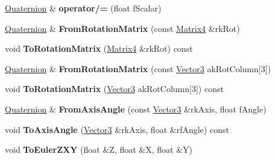 \begin{DoxyCompactItemize}
\item 
\hyperlink{class_magnum_1_1_quaternion}{Quaternion} \& {\bfseries operator/=} (float f\+Scalar)\hypertarget{class_magnum_1_1_quaternion_aa4cd592c599799502807638c4d74e679}{}\label{class_magnum_1_1_quaternion_aa4cd592c599799502807638c4d74e679}

\item 
\hyperlink{class_magnum_1_1_quaternion}{Quaternion} \& {\bfseries From\+Rotation\+Matrix} (const \hyperlink{class_magnum_1_1_matrix4}{Matrix4} \&rk\+Rot)\hypertarget{class_magnum_1_1_quaternion_a3c4faad300d6c95723f59189d76ca893}{}\label{class_magnum_1_1_quaternion_a3c4faad300d6c95723f59189d76ca893}

\item 
void {\bfseries To\+Rotation\+Matrix} (\hyperlink{class_magnum_1_1_matrix4}{Matrix4} \&rk\+Rot) const \hypertarget{class_magnum_1_1_quaternion_a5547a9e5d62aad19551a23bb74a261d1}{}\label{class_magnum_1_1_quaternion_a5547a9e5d62aad19551a23bb74a261d1}

\item 
\hyperlink{class_magnum_1_1_quaternion}{Quaternion} \& {\bfseries From\+Rotation\+Matrix} (const \hyperlink{class_magnum_1_1_vector3}{Vector3} ak\+Rot\+Column\mbox{[}3\mbox{]})\hypertarget{class_magnum_1_1_quaternion_a443df77eebd4a22a859ac25f94d24fca}{}\label{class_magnum_1_1_quaternion_a443df77eebd4a22a859ac25f94d24fca}

\item 
void {\bfseries To\+Rotation\+Matrix} (\hyperlink{class_magnum_1_1_vector3}{Vector3} ak\+Rot\+Column\mbox{[}3\mbox{]}) const \hypertarget{class_magnum_1_1_quaternion_af879e18fbcaa0b32d5f5dedae3b2f429}{}\label{class_magnum_1_1_quaternion_af879e18fbcaa0b32d5f5dedae3b2f429}

\item 
\hyperlink{class_magnum_1_1_quaternion}{Quaternion} \& {\bfseries From\+Axis\+Angle} (const \hyperlink{class_magnum_1_1_vector3}{Vector3} \&rk\+Axis, float f\+Angle)\hypertarget{class_magnum_1_1_quaternion_acc340a4359729eb309871aa231553432}{}\label{class_magnum_1_1_quaternion_acc340a4359729eb309871aa231553432}

\item 
void {\bfseries To\+Axis\+Angle} (\hyperlink{class_magnum_1_1_vector3}{Vector3} \&rk\+Axis, float \&rf\+Angle) const \hypertarget{class_magnum_1_1_quaternion_ad298671cde6cba26d189a52b03d8e889}{}\label{class_magnum_1_1_quaternion_ad298671cde6cba26d189a52b03d8e889}

\item 
void {\bfseries To\+Euler\+Z\+XY} (float \&Z, float \&X, float \&Y)\hypertarget{class_magnum_1_1_quaternion_a39b02fcbbda6217f949225744f3478c1}{}\label{class_magnum_1_1_quaternion_a39b02fcbbda6217f949225744f3478c1}


\end{DoxyCompactItemize}
